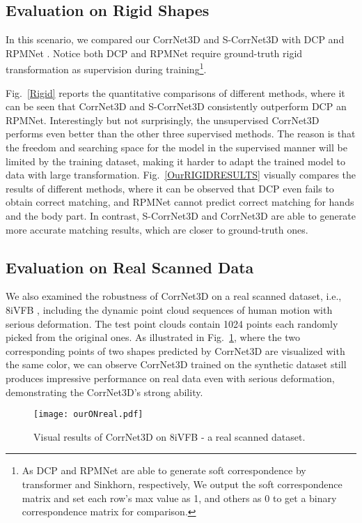 \documentclass[final]{cvpr}
\begin{document}
\subsection{Evaluation on Rigid Shapes}
In this scenario, we compared our CorrNet3D and S-CorrNet3D with DCP \cite{wang2019deep} and RPMNet \cite{yew2020rpm}. Notice both DCP and RPMNet require ground-truth rigid transformation as supervision during training\footnote{As DCP and RPMNet are able to generate soft correspondence by transformer and Sinkhorn, respectively, We output the soft correspondence matrix and set each row's max value as 1, and others as 0 to get a binary correspondence matrix for comparison.}.










Fig.~\ref{Rigid} reports the quantitative comparisons of different methods, where it can be seen that  CorrNet3D and S-CorrNet3D consistently outperform DCP an RPMNet. 
Interestingly but not surprisingly,  the unsupervised CorrNet3D performs even better than the other three supervised methods.  The reason is that 
the freedom and searching space for the model in the supervised manner will be limited by the training dataset, making it harder to adapt the trained model to data with large transformation. 
Fig.~\ref{OurRIGIDRESULTS} visually compares the results of different methods, 
where it can be observed that DCP even fails to obtain correct matching, and RPMNet cannot predict correct matching for hands and the body part. In contrast, S-CorrNet3D and CorrNet3D are able to generate more accurate matching results, which are closer to ground-truth ones.







\subsection{Evaluation on Real Scanned Data}
We also examined the robustness of CorrNet3D on a real scanned dataset, i.e., 8iVFB \cite{d20178i}, including the dynamic point cloud sequences of human motion with serious deformation. The test point clouds contain 1024 points each randomly picked from the original ones. 
As illustrated in Fig.~\ref{Real}, where the two corresponding points of two shapes predicted by CorrNet3D are visualized with the same color,  we can observe CorrNet3D trained on the synthetic dataset still produces impressive performance on real data even with  serious deformation, demonstrating the CorrNet3D's strong ability. \begin{figure}[t]
   \centering
   \texttt{[image: ourONreal.pdf]}
   \caption{Visual results of CorrNet3D on 8iVFB \cite{d20178i} - a real scanned dataset.}
     \label{Real}
 \end{figure}
\end{document}
